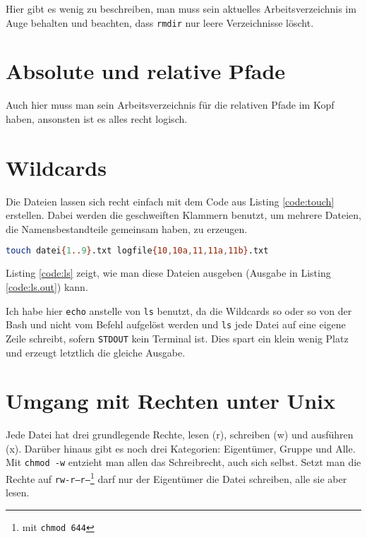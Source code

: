 Hier gibt es wenig zu beschreiben, man muss sein aktuelles Arbeitsverzeichnis im Auge behalten und beachten, dass \texttt{rmdir} nur leere Verzeichnisse löscht.

\section{Absolute und relative Pfade}

Auch hier muss man sein Arbeitsverzeichnis für die relativen Pfade im Kopf haben, ansonsten ist es alles recht logisch.

\section{Wildcards}

Die Dateien lassen sich recht einfach mit dem Code aus Listing \ref{code:touch} erstellen. Dabei werden die geschweiften Klammern benutzt, um mehrere Dateien, die Namensbestandteile gemeinsam haben, zu erzeugen.

\begin{lstlisting}[caption=Anlegen der Dateien, language=bash, label=code:touch, float=htb]
touch datei{1..9}.txt logfile{10,10a,11,11a,11b}.txt
\end{lstlisting}

Listing \ref{code:ls} zeigt, wie man diese Dateien ausgeben (Ausgabe in Listing \ref{code:ls.out}) kann.




Ich habe hier \texttt{echo} anstelle von \texttt{ls} benutzt, da die Wildcards so oder so von der Bash und nicht vom Befehl aufgelöst werden und \texttt{ls} jede Datei auf eine eigene Zeile schreibt, sofern \texttt{STDOUT} kein Terminal ist. Dies spart ein klein wenig Platz und erzeugt letztlich die gleiche Ausgabe.

\section{Umgang mit Rechten unter Unix}

Jede Datei hat drei grundlegende Rechte, lesen (r), schreiben (w) und ausführen (x). Darüber hinaus gibt es noch drei Kategorien: Eigentümer, Gruppe und Alle. Mit \texttt{chmod -w} entzieht man allen das Schreibrecht, auch sich selbst. Setzt man die Rechte auf \texttt{rw-r--r--}\footnote{mit \texttt{chmod 644}} darf nur der Eigentümer die Datei schreiben, alle sie aber lesen.

